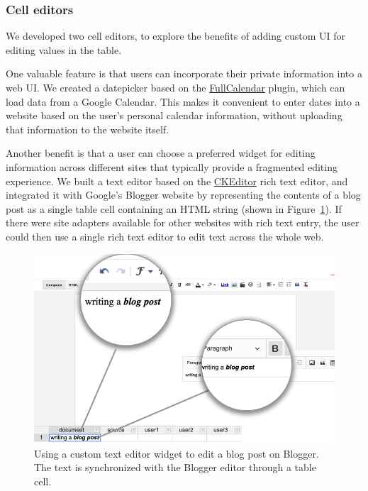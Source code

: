 \documentclass[sigplan,screen,10pt,anonymous,review]{acmart}
\begin{document}
\hypertarget{cell-editors}{%
\subsubsection{Cell editors}\label{cell-editors}}

We developed two cell editors, to explore the benefits of adding custom
UI for editing values in the table.

One valuable feature is that users can incorporate their private
information into a web UI. We created a datepicker based on the
\href{https://fullcalendar.io/}{FullCalendar} plugin, which can load
data from a Google Calendar. This makes it convenient to enter dates
into a website based on the user's personal calendar information,
without uploading that information to the website itself.

Another benefit is that a user can choose a preferred widget for editing
information across different sites that typically provide a fragmented
editing experience. We built a text editor based on the
\href{https://ckeditor.com/}{CKEditor} rich text editor, and integrated
it with Google's Blogger website by representing the contents of a blog
post as a single table cell containing an HTML string (shown in
Figure~\ref{fig:blogger}). If there were site adapters available for
other websites with rich text entry, the user could then use a single
rich text editor to edit text across the whole web.

\begin{figure}
\hypertarget{fig:blogger}{%
\centering
\includegraphics[width=\columnwidth]{media/blogger.png}
\caption{Using a custom text editor widget to edit a blog post on Blogger. The text is synchronized with the Blogger editor through a table cell.}\label{fig:blogger}
}
\end{figure}
\end{document}
